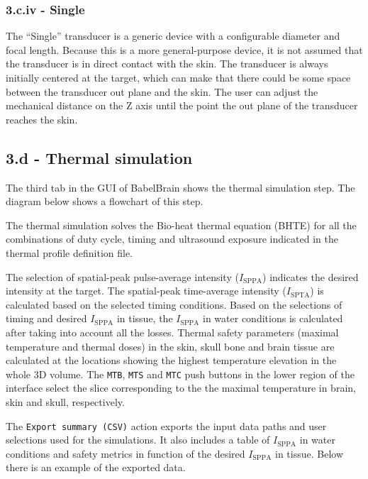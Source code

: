 \hypertarget{c.iv---single}{%
\subsubsection{3.c.iv - Single}\label{c.iv---single}}

The ``Single'' transducer is a generic device with a configurable
diameter and focal length. Because this is a more general-purpose
device, it is not assumed that the transducer is in direct contact with
the skin. The transducer is always initially centered at the target,
which can make that there could be some space between the transducer out
plane and the skin. The user can adjust the mechanical distance on the Z
axis until the point the out plane of the transducer reaches the skin.

\hypertarget{d---thermal-simulation}{%
\subsection{3.d - Thermal simulation}\label{d---thermal-simulation}}

The third tab in the GUI of BabelBrain shows the thermal simulation
step. The diagram below shows a flowchart of this step.

The thermal simulation solves the Bio-heat thermal equation (BHTE) for
all the combinations of duty cycle, timing and ultrasound exposure
indicated in the thermal profile definition file.

The selection of spatial-peak pulse-average intensity
(\(I_{\text{SPPA}}\)) indicates the desired intensity at the target. The
spatial-peak time-average intensity (\(I_{\text{SPTA}}\)) is calculated
based on the selected timing conditions. Based on the selections of
timing and desired \(I_{\text{SPPA}}\) in tissue, the
\(I_{\text{SPPA}}\) in water conditions is calculated after taking into
account all the losses. Thermal safety parameters (maximal temperature
and thermal doses) in the skin, skull bone and brain tissue are
calculated at the locations showing the highest temperature elevation in
the whole 3D volume. The \texttt{MTB}, \texttt{MTS} and \texttt{MTC}
push buttons in the lower region of the interface select the slice
corresponding to the the maximal temperature in brain, skin and skull,
respectively.

The \texttt{Export\ summary\ (CSV)} action exports the input data paths
and user selections used for the simulations. It also includes a table
of \(I_{\text{SPPA}}\) in water conditions and safety metrics in
function of the desired \(I_{\text{SPPA}}\) in tissue. Below there is an
example of the exported data.

